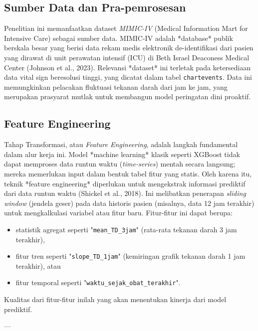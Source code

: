 \subsection{Sumber Data dan Pra-pemrosesan}
Penelitian ini memanfaatkan dataset \textit{MIMIC-IV} (Medical Information Mart for Intensive Care) sebagai sumber data. MIMIC-IV adalah *database* publik berskala besar yang berisi data rekam medis elektronik de-identifikasi dari pasien yang dirawat di unit perawatan intensif (ICU) di Beth Israel Deaconess Medical Center (Johnson et al., 2023). Relevansi *dataset* ini terletak pada ketersediaan data vital sign beresolusi tinggi, yang dicatat dalam tabel \texttt{chartevents}. Data ini memungkinkan pelacakan fluktuasi tekanan darah dari jam ke jam, yang merupakan prasyarat mutlak untuk membangun model peringatan dini proaktif.

\subsection{Feature Engineering}
Tahap Transformasi, atau \textit{Feature Engineering}, adalah langkah fundamental dalam alur kerja ini. Model *machine learning* klasik seperti XGBoost tidak dapat memproses data runtun waktu (\textit{time-series}) mentah secara langsung; mereka memerlukan input dalam bentuk tabel fitur yang statis. Oleh karena itu, teknik *feature engineering* diperlukan untuk mengekstrak informasi prediktif dari data runtun waktu (Shickel et al., 2018). Ini melibatkan penerapan \textit{sliding window} (jendela geser) pada data historis pasien (misalnya, data 12 jam terakhir) untuk mengkalkulasi variabel atau fitur baru. Fitur-fitur ini dapat berupa:
\begin{itemize}
    \item statistik agregat seperti "\texttt{mean\_TD\_3jam}" (rata-rata tekanan darah 3 jam terakhir),
    \item fitur tren seperti "\texttt{slope\_TD\_1jam}" (kemiringan grafik tekanan darah 1 jam terakhir), atau
    \item fitur temporal seperti "\texttt{waktu\_sejak\_obat\_terakhir}".
\end{itemize}
Kualitas dari fitur-fitur inilah yang akan menentukan kinerja dari model prediktif.

--- %
